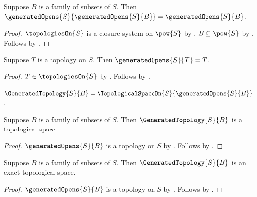 \begin{proposition}\label{generated_opens_idempotent}
    Suppose $B$ is a family of subsets of $S$.
    Then $\generatedOpens{S}{\generatedOpens{S}{B}}
        =\generatedOpens{S}{B}$.
\end{proposition}
\begin{proof}
    $\topologiesOn{S}$ is a closure system on $\pow{S}$ by
        .
    $B\subseteq\pow{S}$ by .
    Follows by .
\end{proof}

\begin{theorem}\label{topology_generates_itself}
    Suppose $T$ is a topology on $S$.
    Then $\generatedOpens{S}{T}=T$.
\end{theorem}
\begin{proof}
    $T\in\topologiesOn{S}$ by .
    Follows by
        .
\end{proof}

\begin{definition}\label{generated_topology}
    $\GeneratedTopology{S}{B}
        =\TopologicalSpaceOn{S}{\generatedOpens{S}{B}}$.
\end{definition}

\begin{classification}\label{generated_topology_is_topological_space}
    Suppose $B$ is a family of subsets of $S$.
    Then $\GeneratedTopology{S}{B}$ is a topological space.
\end{classification}
\begin{proof}
    $\generatedOpens{S}{B}$ is a topology on $S$ by
        .
    Follows by
        .
\end{proof}

\begin{theorem}\label{generated_topology_is_exact}
    Suppose $B$ is a family of subsets of $S$.
    Then $\GeneratedTopology{S}{B}$ is an exact topological space.
\end{theorem}
\begin{proof}
    $\generatedOpens{S}{B}$ is a topology on $S$ by
        .
    Follows by .
\end{proof}

